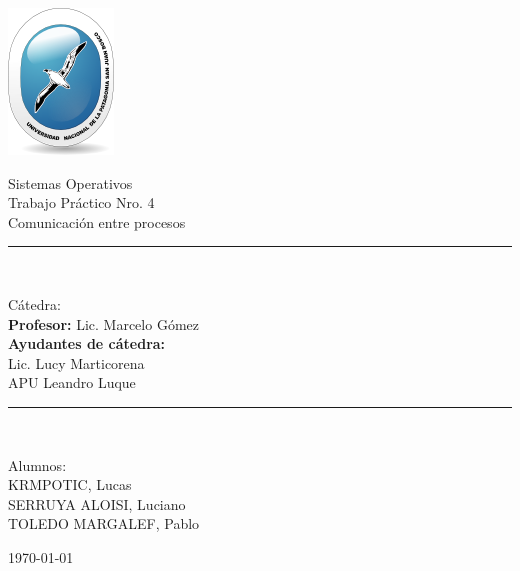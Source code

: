 \documentclass[12pt]{extarticle}
\newcommand{\fecha}{\today}
\begin{document}
    \begin{titlepage}

        \begin{center}
            \includegraphics{logoUnpsjb.png}
            \linebreak
            \begin{huge}
                Sistemas Operativos \\ Trabajo Práctico Nro. 4 \\ Comunicación entre procesos\\
            \end{huge}
            \vspace*{5mm}
            \rule{10cm}{0.1mm}\\
            \vspace*{3mm}
            \begin{LARGE}
                Cátedra:\\
                \textbf{Profesor:} Lic. Marcelo Gómez\\
                \vspace*{5mm}
                \textbf{Ayudantes de cátedra:}\\ Lic. Lucy Marticorena\\APU Leandro Luque\\
            \end{LARGE}
            \vspace*{3mm}
            \rule{10cm}{0.1mm}\\
            \vspace*{5mm}
            \begin{Large}
                Alumnos:\\
                KRMPOTIC, Lucas\\
                SERRUYA ALOISI, Luciano\\
                TOLEDO MARGALEF, Pablo\\
            \end{Large}
            \vspace*{5mm}
            \Large\fecha
    \end{center}

    \end{titlepage}
\end{document}
